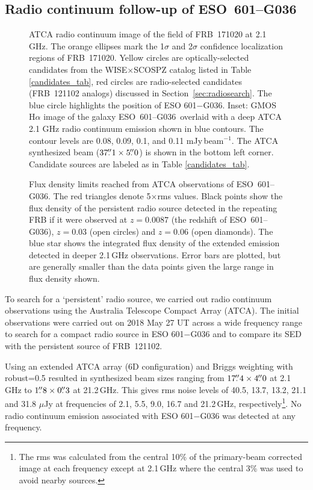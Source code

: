 \documentclass[twocolumn]{aastex63}
\newcommand{\galname}{ESO~601--G036}
\begin{document}
\subsection{Radio continuum follow-up of \galname}

\begin{figure*}
\caption{ATCA radio continuum image of the field of FRB~171020 at 2.1 GHz.  The orange ellipses mark the 1$\sigma$ and 2$\sigma$ confidence localization regions of FRB~171020. Yellow circles are optically-selected candidates from the WISE$\times$SCOSPZ catalog listed in Table \ref{candidates_tab}, red circles are radio-selected candidates (FRB~121102 analogs) discussed in Section~\ref{sec:radiosearch}. The blue circle highlights the position of ESO 601$-$G036. Inset: GMOS H$\alpha$ image of the galaxy \galname\ overlaid with a deep ATCA 2.1 GHz radio continuum emission shown in blue contours. The contour levels are 0.08, 0.09, 0.1, and 0.11 mJy\,beam$^{-1}$. The ATCA synthesized beam ($37\mbox{$.\!\!^{\prime\prime}$}1 \times 5\mbox{$.\!\!^{\prime\prime}$}0$) is shown in the bottom left corner. Candidate sources are labeled as in Table \ref{candidates_tab}.  \label{atca_obs2}}
\end{figure*}

\begin{figure}
\caption{Flux density limits reached from ATCA observations of \galname. The red triangles denote 5$\times$rms values. Black points show the flux density of the persistent radio source detected in the repeating FRB if it were observed at $z=0.0087$ (the redshift of \galname), $z=0.03$ (open circles) and $z=0.06$ (open diamonds). The blue star shows the integrated flux density of the extended emission detected in deeper 2.1\,GHz observations. Error bars are plotted, but are generally smaller than the data points given the large range in flux density shown. \label{flux_limits}}
\end{figure}

To search for a `persistent' radio source, we carried out radio continuum observations using the Australia Telescope Compact Array (ATCA). The initial observations were carried out on 2018 May 27 UT across a wide frequency range to search for a compact radio source in ESO 601$-$G036 and to
compare its SED with the persistent source of FRB~121102. 

Using an extended ATCA array (6D configuration) and Briggs weighting with robust=0.5 resulted in synthesized beam sizes ranging from $17\mbox{$.\!\!^{\prime\prime}$}4 \times 4\mbox{$.\!\!^{\prime\prime}$}0$ at 2.1\,GHz to $1\mbox{$.\!\!^{\prime\prime}$}8 \times 0\mbox{$.\!\!^{\prime\prime}$}3$ at 21.2\,GHz. This gives rms noise levels of 40.5, 13.7, 13.2, 21.1 and 31.8 $\mu$Jy at frequencies of 2.1, 5.5, 9.0, 16.7 and 21.2\,GHz, respectively\footnote{The rms was calculated from the central 10\% of the primary-beam corrected image at each frequency except at 2.1\,GHz where the central 3\% was used to avoid nearby sources.}. No radio continuum emission associated with ESO 601$-$G036 was detected at any frequency. 
\end{document}
